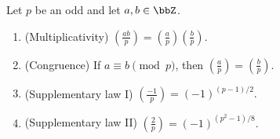 \begin{proposition} \label{proposition:properties_of_legendre_and_jacobi_symbols}
    Let $p$ be an odd  and let $a, b \in \bbZ$.
    \begin{enumerate}
        \item (Multiplicativity) $\left(\frac{ab}{p}\right) = \left(\frac{a}{p}\right)\left(\frac{b}{p}\right).$
        \item (Congruence) If $a \equiv b \pmod{p}$, then $\left(\frac{a}{p}\right) = \left(\frac{b}{p}\right).$
        \item (Supplementary law I) $\left(\frac{-1}{p}\right) = (-1)^{(p-1)/2}.$
        \item (Supplementary law II) $\left(\frac{2}{p}\right) = (-1)^{(p^2-1)/8}.$
    \end{enumerate}
\end{proposition}
